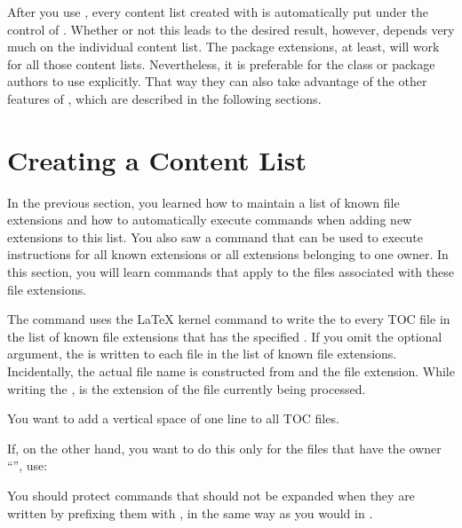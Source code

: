 After you use , every content list created with
 is automatically put under the control of
. Whether or not this leads to the desired result, however,
depends very much on the individual content list. The  package
extensions, at least, will work for all those content lists. Nevertheless, it
is preferable for the class or package authors to use 
explicitly. That way they can also take advantage of the other features of
, which are described in the following sections.%
\EndIndexGroup


\section{Creating a Content List}

In the previous section, you learned how to maintain a list of known file
extensions and how to automatically execute commands when adding new
extensions to this list. You also saw a command that can be used to execute
instructions for all known extensions or all extensions belonging to one
owner. In this section, you will learn commands that apply to the files
associated with these file extensions.

\begin{Declaration}
\end{Declaration}
The  command uses the \LaTeX{} kernel command
 to write the  to every TOC file in the list of known file extensions that has the specified
. If you omit the optional argument, the  is
written to each file in the list of known file extensions. Incidentally, the
actual file name is constructed from  and the file extension.
While writing the ,
 is the
extension of the file currently being processed.
\begin{Example}
  You want to add a vertical space of one line to all TOC files.
\begin{lstcode}
    \addtoeachtocfile{%
      \protect\addvspace{\protect\baselineskip}%
    }
\end{lstcode}
  If, on the other hand, you want to do this only for the files that have the
  owner ``'', use:
\begin{lstcode}
    \addtoeachtocfile[foo]{%
      \protect\addvspace{\protect\baselineskip}%
    }
\end{lstcode}
\end{Example}
You should protect commands that should not be expanded when they are written
by prefixing them with , in the same way as you would in
.
\EndIndexGroup


